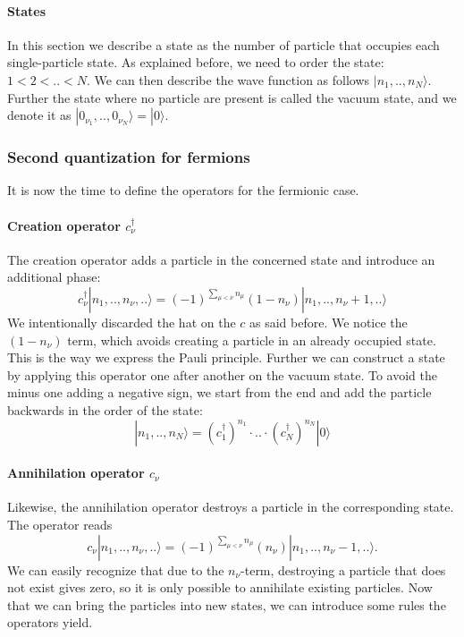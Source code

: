 \documentclass[../main.tex]{subfile}
\begin{document}
\paragraph{States} $~$\\

In this section we describe a state as the number of particle that occupies each single-particle state. As explained before, we need to
order the state: $1<2<..<N$. We can then describe the wave function as follows $|n_{1},..,n_{N}\rangle$.\\

Further the state where no particle are present is called the vacuum state, and we denote it as $|0_{\nu_1},..,0_{\nu_N}\rangle = |0\rangle$.

\subsubsection{Second quantization for fermions}$~$\\

It is now the time to define the operators for the fermionic case.
\paragraph{Creation operator $c_\nu^{\dagger}$}$~$\\

The creation operator adds a particle in the concerned state and introduce an additional phase:
\[
    c_{\nu}^{\dagger} |n_{1},..,n_{\nu},..\rangle = (-1)^{\sum_{\mu<\nu}n_{\mu}} (1-n_{\nu})|n_{1},..,n_{\nu}+1,..\rangle
\]
We intentionally discarded the hat on the $c$ as said before.
We notice the $ (1-n_{\nu})$ term, which avoids creating a particle in an already occupied state. This is the way we express
the Pauli principle. 
Further we can construct a state by applying this operator one after another on the vacuum state. To avoid the minus one adding a negative sign, we start from the 
end and add the particle backwards in the order of the state:
\[
    |n_{1},..,n_{N}\rangle = (c_{1}^{\dagger})^{n_{1}}\cdot ..\cdot (c_{N}^{\dagger})^{n_{N}} |0\rangle
\]  

\paragraph{Annihilation operator $c_\nu$}$~$\\

Likewise, the annihilation operator destroys a particle in the corresponding state. The operator reads
\[
    c_{\nu} |n_{1},..,n_{\nu},..\rangle = (-1)^{\sum_{\mu<\nu}n_{\mu}} (n_{\nu})|n_{1},..,n_{\nu}-1,..\rangle.
\]
We can easily recognize that due to the $n_{\nu}$-term, destroying a particle that does not exist gives zero, 
so it is only possible to annihilate existing particles. Now that we can bring the particles into new states, we can introduce some rules
the operators yield.
\end{document}
